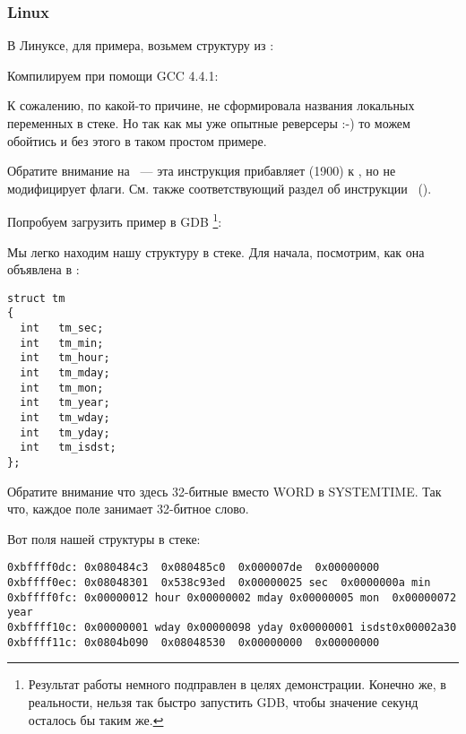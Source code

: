 ﻿\subsubsection{Linux}

В Линуксе, для примера, возьмем структуру  из :



Компилируем при помощи GCC 4.4.1:



К сожалению, по какой-то причине, \IDA не сформировала названия локальных переменных в стеке. 
Но так как мы уже опытные реверсеры :-) то можем обойтись и без этого в таком простом примере.

Обратите внимание на  ~--- эта инструкция прибавляет  (1900) к \EAX, 
но не модифицирует флаги. См. также соответствующий раздел об инструкции \LEA{}~().



Попробуем загрузить пример в GDB
\footnote{Результат работы  немного подправлен в целях демонстрации.
Конечно же, в реальности, нельзя так быстро запустить GDB, чтобы значение секунд осталось бы таким же.}:



Мы легко находим нашу структуру в стеке.
Для начала, посмотрим, как она объявлена в :

\begin{lstlisting}[caption=time.h, label=struct_tm,style=customc]
struct tm
{
  int	tm_sec;
  int	tm_min;
  int	tm_hour;
  int	tm_mday;
  int	tm_mon;
  int	tm_year;
  int	tm_wday;
  int	tm_yday;
  int	tm_isdst;
};
\end{lstlisting}

Обратите внимание что здесь 32-битные \Tint вместо WORD в SYSTEMTIME.
Так что, каждое поле занимает 32-битное слово.

Вот поля нашей структуры в стеке:

\begin{lstlisting}
0xbffff0dc:	0x080484c3	0x080485c0	0x000007de	0x00000000
0xbffff0ec:	0x08048301	0x538c93ed	0x00000025 sec	0x0000000a min
0xbffff0fc:	0x00000012 hour	0x00000002 mday	0x00000005 mon 	0x00000072 year
0xbffff10c:	0x00000001 wday	0x00000098 yday	0x00000001 isdst0x00002a30
0xbffff11c:	0x0804b090	0x08048530	0x00000000	0x00000000
\end{lstlisting}

